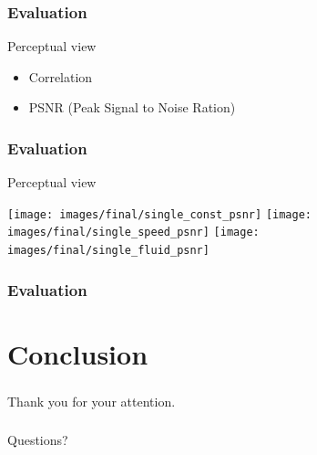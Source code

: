 \documentclass[18pt]{beamer}
\begin{document}
\begin{frame}[t]
  \frametitle{Evaluation}
  \large{Perceptual view}
  \begin{itemize}
  \item Correlation
  \item PSNR (Peak Signal to Noise Ration)
  \end{itemize}

\end{frame}

\begin{frame}[t]
  \frametitle{Evaluation}
  \large{Perceptual view}
  \begin{center}
  \texttt{[image: images/final/single\_const\_psnr]}
  \texttt{[image: images/final/single\_speed\_psnr]}
  \texttt{[image: images/final/single\_fluid\_psnr]}
  \end{center}

\end{frame}


\begin{frame}[t]
  \frametitle{Evaluation}
\end{frame}


\section{Conclusion}

\begin{frame}
  \frametitle{}
  \begin{center}
    \huge{Thank you for your attention.}
  \end{center}
\end{frame}

\begin{frame}
  \frametitle{}
  \begin{center}
    \huge{Questions?}
  \end{center}
\end{frame}
\end{document}
